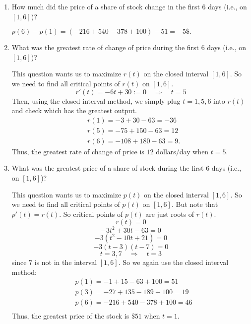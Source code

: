 \documentclass[nooutcomes, handout]{ximera}
\begin{document}
\begin{problem}
\begin{enumerate}
		
		
	
	\item  How much did the price of a share of stock change in the first $6$ days (i.e., on $[1,6]$)?  
		\begin{freeResponse}
		$p(6) - p(1) = (-216+540-378+100) - 51 = -5\$. $
		\end{freeResponse}
		
		
		
	
	\item  What was the greatest rate of change of price during the first $6$ days (i.e., on $[1,6]$)?  
		\begin{freeResponse}
		This question wants us to maximize $r(t)$ on the closed interval $[1,6]$.  
		So we need to find all critical points of $r(t)$ on $[1,6]$.  
		$$ r'(t) = -6t+30:=0 \quad \Longrightarrow \quad t=5  $$
		Then, using the closed interval method, we simply plug $t=1,5,6$ into $r(t)$ and check which has the greatest output.  
			\begin{align*}
			&r(1) = -3+30-63=-36  \\
			&r(5) = -75+150-63=12  \\
			&r(6) = -108+180-63=9.
			\end{align*}
		Thus, the greatest rate of change of price is $12$ dollars/day when $t=5$.  
		\end{freeResponse}
		
		
		
	
	\item  What was the greatest price of a share of stock during the first $6$ days (i.e., on $[1,6]$)?  
		\begin{freeResponse}
		This question wants us to maximize $p(t)$ on the closed interval $[1,6]$.  
		So we need to find all critical points of $p(t)$ on $[1,6]$. 
		But note that $p'(t) = r(t)$.  So critical points of $p(t)$ are just roots of $r(t)$.  
		$$ r(t) = 0 $$
		$$ -3t^2+30t-63 = 0 $$
		$$ -3(t^2-10t+21)=0 $$
		$$ -3(t-3)(t-7) = 0 $$
		$$ t=3,7 \quad \Longrightarrow \quad t=3 $$
		since $7$ is not in the interval $[1,6]$.  
		So we again use the closed interval method:
			\begin{align*}
			&p(1) = -1+15-63+100 = 51  \\
			&p(3) = -27 + 135 - 189 + 100 = 19  \\
			&p(6) = -216+540-378+100=46  \\
			\end{align*}
		Thus, the greatest price of the stock is $\$51$ when $t=1$.  
		\end{freeResponse}
		
		
		
	
	\end{enumerate}


\end{problem}
\end{document}

